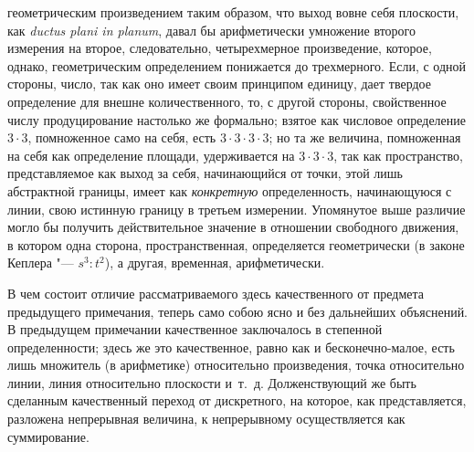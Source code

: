 геометрическим произведением таким образом, что выход вовне себя плоскости,
как {\em ductus plani in planum}, давал бы
арифметически умножение второго измерения на второе, следовательно,
четырехмерное произведение, которое, однако, геометрическим определением
понижается до трехмерного. Если, с одной стороны, число, так как оно имеет
своим принципом единицу, дает твердое определение для внешне
количественного, то, с другой стороны, свойственное числу продуцирование
настолько же формально; взятое как числовое определение $3 \cdot 3$, помноженное
само на себя, есть $3 \cdot 3 \cdot 3 \cdot 3$; но та же величина, помноженная на себя
как определение площади, удерживается на $3 \cdot 3 \cdot 3$, так как пространство,
представляемое как выход за себя, начинающийся от точки, этой лишь
абстрактной границы, имеет как {\em конкретную}
определенность, начинающуюся с линии, свою истинную границу в третьем
измерении. Упомянутое выше различие могло бы получить действительное
значение в отношении свободного движения, в котором одна сторона,
пространственная, определяется геометрически (в законе Кеплера "---
$s^3 : t^2$), а другая, временная, арифметически.

В чем состоит отличие рассматриваемого здесь качественного от предмета
предыдущего примечания, теперь само собою ясно и без дальнейших объяснений.
В предыдущем примечании качественное заключалось в степенной
определенности; здесь же это качественное, равно как и бесконечно-малое,
есть лишь множитель (в арифметике) относительно произведения, точка
относительно линии, линия относительно плоскости и~т.~д. Долженствующий же
быть сделанным качественный переход от дискретного, на которое, как
представляется, разложена непрерывная величина, к непрерывному
осуществляется как суммирование.

